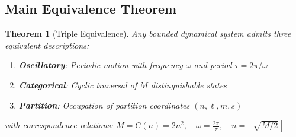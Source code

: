 \documentclass[twocolumn,10pt]{article}
\newtheorem{theorem}{Theorem}[section]
\begin{document}
\subsection{Main Equivalence Theorem}

\begin{theorem}[Triple Equivalence]
\label{thm:triple}
Any bounded dynamical system admits three equivalent descriptions:
\begin{enumerate}
    \item \textbf{Oscillatory}: Periodic motion with frequency $\omega$ and period $\tau = 2\pi/\omega$
    \item \textbf{Categorical}: Cyclic traversal of $M$ distinguishable states
    \item \textbf{Partition}: Occupation of partition coordinates $(n, \ell, m, s)$
\end{enumerate}
with correspondence relations:
$
M = C(n) = 2n^2, \quad \omega = \frac{2\pi}{\tau}, \quad n = \left\lfloor \sqrt{M/2} \right\rfloor
$
\end{theorem}
\end{document}
